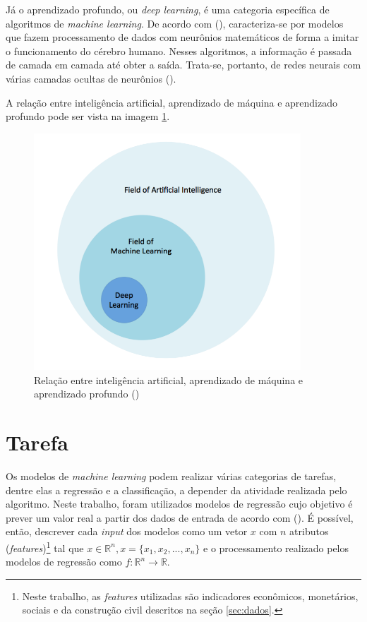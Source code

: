 Já o aprendizado profundo, ou \textit{deep learning}, é uma 
categoria específica de algoritmos de \textit{machine learning}. 
De acordo com (\cite{deeplearningbook}), caracteriza-se por 
modelos que fazem processamento de dados com neurônios 
matemáticos de forma a imitar o 
funcionamento do cérebro humano. Nesses algoritmos, a informação
é passada de camada em camada até obter a saída. Trata-se, portanto,
de redes neurais com várias camadas ocultas de neurônios (\cite{d2l}). 

A relação entre inteligência artificial, aprendizado de 
máquina e aprendizado profundo pode ser vista na 
imagem \ref{fig:ia_ml}.

\begin{figure}[H] 
  \includegraphics[width= 10cm]{../figuras/ia_ml.png}
  \caption{Relação entre inteligência artificial, aprendizado de máquina e aprendizado profundo (\cite{dl-oreilly})}
  \label{fig:ia_ml}
\end{figure}

\section{Tarefa}
 
Os modelos de \textit{machine learning} podem realizar várias categorias 
de tarefas, dentre elas a regressão e a classificação, a 
depender da atividade realizada pelo algoritmo.
Neste trabalho,  foram utilizados modelos de regressão cujo objetivo é prever um valor real a 
partir dos dados de entrada de acordo com (\cite{Goodfellow-et-al-2016}).
É possível, então, descrever cada \textit{input} dos modelos como um vetor $x$ com 
$n$ atributos (\textit{features})\footnote{Neste trabalho, 
as \textit{features} utilizadas são indicadores econômicos, monetários,
sociais e da construção civil descritos na seção \ref{sec:dados}.} tal que
$x \in \mathbb{R}^n , x=\{x_1, x_2, ..., x_n\}$ e o 
processamento realizado pelos modelos de regressão como $ f : \mathbb{R}^n \rightarrow \mathbb{R}$. 

